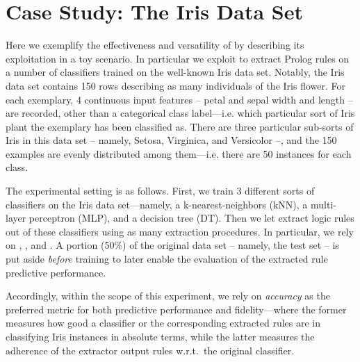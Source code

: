 \documentclass[12pt,a4paper,openright,twoside]{book}
\begin{document}
\section{Case Study: The Iris Data Set}\label{sec:experiments}

Here we exemplify the effectiveness and versatility of \psyke{} by describing its exploitation in a toy scenario.
%
In particular we exploit \psyke{} to extract Prolog rules on a number of classifiers trained on the well-known Iris data set\footnotemark.
%
%
Notably, the Iris data set contains 150 rows describing as many individuals of the Iris flower.
%
For each exemplary, 4 continuous input features -- petal and sepal width and length -- are recorded, other than a categorical class label---i.e. which particular sort of Iris plant the exemplary has been classified as.
%
There are three particular sub-sorts of Iris in this data set -- namely, Setosa, Virginica, and Versicolor --, and the 150 examples are evenly distributed among them---i.e. there are 50 instances for each class.

The experimental setting is as follows.
%
First, we train 3 different sorts of classifiers on the Iris data set---namely, a k-nearest-neighbors (kNN), a multi-layer perceptron (MLP), and a decision tree (DT).
%
Then we let \psyke{} extract logic rules out of these classifiers using as many extraction procedures.
%
In particular, we rely on \real{},  \trepan{}, and \cart{}.
%
A portion (50\%) of the original data set -- namely, the test set -- is put aside \emph{before} training to later enable the evaluation of the extracted rule predictive performance.
%
%
%

Accordingly, within the scope of this experiment, we rely on \emph{accuracy} as the preferred metric for both predictive performance and fidelity---where the former measures how good a classifier or the corresponding extracted rules are in classifying Iris instances in absolute terms, while the latter measures the adherence of the extractor output rules w.r.t.\ the original classifier.
\end{document}
